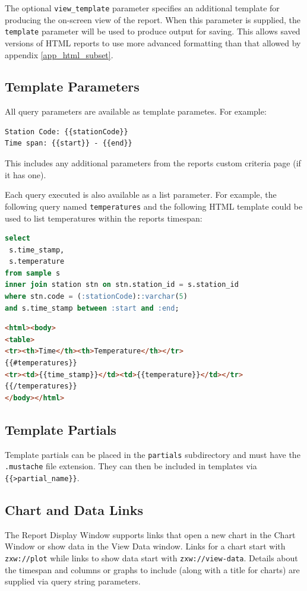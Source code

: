 \documentclass[a4paper,10pt]{book}
\begin{document}
The optional \verb|view_template| parameter specifies an additional template for producing the on-screen view of the report. When this parameter is supplied, the \verb|template| parameter will be used to produce output for saving. This allows saved versions of HTML reports to use more advanced formatting than that allowed by appendix \ref{app_html_subset}.

\subsection{Template Parameters}
All query parameters are available as template parametes. For example:
\begin{verbatim}
Station Code: {{stationCode}}
Time span: {{start}} - {{end}}
\end{verbatim}

This includes any additional parameters from the reports custom criteria page (if it has one).

Each query executed is also available as a list parameter. For example, the following query named \verb|temperatures| and the following HTML template could be used to list temperatures within the reports timespan:
\begin{lstlisting}[language=SQL]
select
 s.time_stamp,
 s.temperature
from sample s
inner join station stn on stn.station_id = s.station_id
where stn.code = (:stationCode)::varchar(5)
and s.time_stamp between :start and :end;
\end{lstlisting}

\begin{lstlisting}[language=HTML]
<html><body>
<table>
<tr><th>Time</th><th>Temperature</th></tr>
{{#temperatures}}
<tr><td>{{time_stamp}}</td><td>{{temperature}}</td></tr>
{{/temperatures}}
</body></html>
\end{lstlisting}

\subsection{Template Partials}
Template partials can be placed in the \verb|partials| subdirectory and must have the \verb|.mustache| file extension. They can then be included in templates via \verb|{{>partial_name}}|.

\subsection{Chart and Data  Links}
The Report Display Window supports links that open a new chart in the Chart Window or show data in the View Data window. Links for a chart start with \verb|zxw://plot| while links to show data start with \verb|zxw://view-data|. Details about the timespan and columns or graphs to include (along with a title for charts) are supplied via query string parameters.
\end{document}

